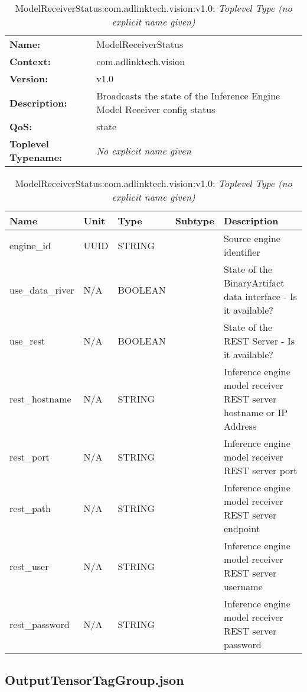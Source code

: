 \begin{table}[H]
\begin{tabularx}{\textwidth}{l X} 
       \textbf{Name:} & ModelReceiverStatus \\ 
	   \textbf{Context:} & com.adlinktech.vision \\ 
	   \textbf{Version:} & v1.0 \\ 
	   \textbf{Description:} & Broadcasts the state of the Inference Engine Model Receiver config status \\ 
	   \textbf{QoS:} & state \\
	   \textbf{Toplevel Typename:} & \textit{No explicit name given} \\ 
\end{tabularx}
\caption{ModelReceiverStatus:com.adlinktech.vision:v1.0}\label{ModelReceiverStatusTagGroup.json:table:ModelReceiverStatus}
\bigskip
\begin{tabularx}{\textwidth}{l l l l X} 
	 \textbf{Name} & \textbf{Unit} & \textbf{Type} & \textbf{Subtype} & \textbf{Description} \\
	 \midrule
   engine\_id & UUID & STRING &  & Source engine identifier \\
   use\_data\_river & N/A & BOOLEAN &  & State of the BinaryArtifact data interface - Is it available? \\
   use\_rest & N/A & BOOLEAN &  & State of the REST Server - Is it available? \\
   rest\_hostname & N/A & STRING &  & Inference engine model receiver REST server hostname or IP Address \\
   rest\_port & N/A & STRING &  & Inference engine model receiver REST server port \\
   rest\_path & N/A & STRING &  & Inference engine model receiver REST server endpoint \\
   rest\_user & N/A & STRING &  & Inference engine model receiver REST server username \\
   rest\_password & N/A & STRING &  & Inference engine model receiver REST server password \\
\end{tabularx}
\caption{ModelReceiverStatus:com.adlinktech.vision:v1.0: \textit{Toplevel Type (no explicit name given)}}\label{ModelReceiverStatusTagGroup.json:table:ModelReceiverStatus-no-type-given}


\end{table}

\subsection{OutputTensorTagGroup.json}

